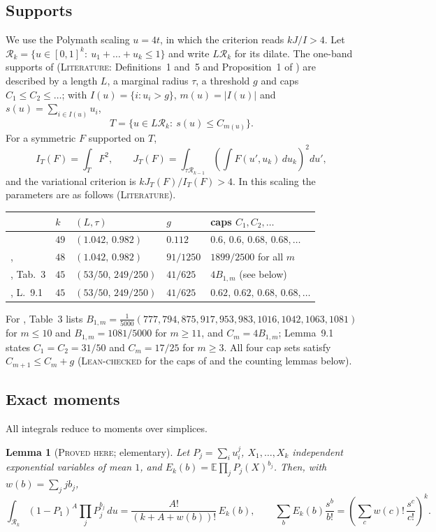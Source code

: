 \documentclass[11pt]{amsart}
\newtheorem{lemma}[theorem]{Lemma}
\theoremstyle{definition}
\theoremstyle{remark}
\newcommand{\lbl}[1]{\textup{\textsc{#1}}}
\newcommand{\R}{\mathcal{R}}
\begin{document}
\subsection*{Supports}
We use the Polymath scaling $u=4t$, in which the criterion reads $kJ/I>4$. Let
$\R_k=\{u\in[0,1]^k:\ u_1+\dots+u_k\le1\}$ and write $L\R_k$ for its dilate.
The one-band supports of \cite{Sta26} (\lbl{Literature}: Definitions~1
and~5 and Proposition~1 of \cite{Sta26}) are described by a length $L$, a marginal radius
$\tau$, a threshold $g$ and caps $C_1\le C_2\le\dots$; with
$I(u)=\{i:u_i>g\}$, $m(u)=|I(u)|$ and $s(u)=\sum_{i\in I(u)}u_i$,
\[
T=\{u\in L\R_k:\ s(u)\le C_{m(u)}\}.
\]
For a symmetric $F$ supported on $T$,
\[
I_T(F)=\int_TF^2,\qquad
J_T(F)=\int_{\tau\R_{k-1}}\left(\int F(u',u_k)\,du_k\right)^2du',
\]
and the variational criterion is $kJ_T(F)/I_T(F)>4$. In this scaling the
parameters are as follows (\lbl{Literature}).
\begin{center}\small
\begin{tabular}{@{}lllll@{}}
\toprule
 & $k$ & $(L,\tau)$ & $g$ & caps $C_1,C_2,\dots$\\
\midrule
\cite{Sta26} & $49$ & $(1.042,\,0.982)$ & $0.112$ & $0.6,\,0.6,\,0.68,\,0.68,\dots$\\
\cite{Kin26}, \cite{SY26} & $48$ & $(1.042,\,0.982)$ & $91/1250$ & $1899/2500$ for all $m$\\
\cite{Cha26}, Tab.~3 & $45$ & $(53/50,\,249/250)$ & $41/625$ & $4B_{1,m}$ (see below)\\
\cite{Cha26}, L.~9.1 & $45$ & $(53/50,\,249/250)$ & $41/625$ & $0.62,\,0.62,\,0.68,\,0.68,\dots$\\
\bottomrule
\end{tabular}
\end{center}
For \cite{Cha26}, Table~3 lists
$B_{1,m}=\frac1{5000}(777,794,875,917,953,983,1016,1042,1063,1081)$ for
$m\le10$ and $B_{1,m}=1081/5000$ for $m\ge11$, and $C_m=4B_{1,m}$; Lemma~9.1
states $C_1=C_2=31/50$ and $C_m=17/25$ for $m\ge3$. All four cap sets satisfy
$C_{m+1}\le C_m+g$ (\lbl{Lean-checked} for the caps of \cite{Cha26} and the
counting lemmas below).

\subsection*{Exact moments}
All integrals reduce to moments over simplices.

\begin{lemma}[\lbl{Proved here}; elementary]\label{lem:egf}
Let $P_j=\sum_iu_i^j$, $X_1,\dots,X_k$ independent exponential variables of
mean $1$, and $E_k(b)=\mathbb E\prod_jP_j(X)^{b_j}$. Then, with
$w(b)=\sum_jjb_j$,
\[
\int_{\R_k}(1-P_1)^A\prod_jP_j^{b_j}\,du=\frac{A!}{(k+A+w(b))!}\,E_k(b),
\qquad
\sum_bE_k(b)\frac{s^b}{b!}=\left(\sum_c w(c)!\,\frac{s^c}{c!}\right)^{k}.
\]
\end{lemma}
\end{document}
